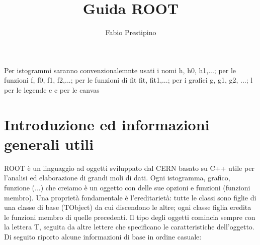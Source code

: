 \documentclass[10pt,a4paper]{article}
\author{Fabio Prestipino}
\title{Guida ROOT}
\begin{document}
	
	\maketitle
	\tableofcontents
	\newpage
Per istogrammi saranno convenzionalemnte usati i nomi h, h0, h1,...; per le funzioni f, f0, f1, f2,...; per le funzioni di fit fit, fit1,...; per i grafici g, g1, g2, ...; l per le legende e c per le canvas
\section{Introduzione ed informazioni generali utili}
ROOT è un linguaggio ad oggetti sviluppato dal CERN basato su C++ utile per l'analisi ed elaborazione di grandi moli di dati. Ogni istogramma, grafico, funzione (...) che creiamo è un oggetto con delle sue opzioni e funzioni (funzioni membro). Una proprietà fondamentale è l'ereditarietà: tutte le classi sono figlie di una classe di base (TObject) da cui discendono le altre; ogni classe figlia eredita le funzioni membro di quelle precedenti. Il tipo degli oggetti comincia sempre con la lettera T, seguita da altre lettere che specificano le caratteristiche dell'oggetto. Di seguito riporto alcune informazioni di base in ordine casuale:
\end{document}
